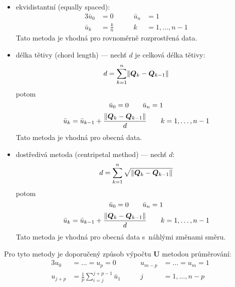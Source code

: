 \begin{itemize}
    \item ekvidistantní (equally spaced):
          \begin{alignat}{3}
              \bar{u}_0 & = 0           \quad\quad & \bar{u}_n & =1                 \\
              \bar{u}_k & = \frac{k}{n} \quad\quad & k         & = 1, \ldots, n - 1
          \end{alignat}
          Tato metoda je vhodná pro rovnoměrně rozprostřená data.
    \item délka tětivy (chord length) --- nechť $d$ je celková délka tětivy:
          \begin{equation}
              d = \sum_{k = 1}^{n}\lVert\bm{Q}_k - \bm{Q}_{k - 1}\rVert
          \end{equation}
          potom
          \begin{equation}
              \bar{u}_0 = 0 \quad\quad \bar{u}_n = 1\\
          \end{equation}
          \begin{equation}
              \bar{u}_k = \bar{u}_{k - 1} + \frac{\lVert\bm{Q}_k - \bm{Q}_{k - 1}\rVert}{d}
              \quad\quad k=1,\ldots,n-1
              \label{eq:chord length}
          \end{equation}
          Tato metoda je vhodná pro obecná data.
    \item dostředivá metoda (centripetal method) --- nechť $d$:
          \begin{equation}
              d = \sum_{k = 1}^{n}\sqrt{\lVert\bm{Q}_k - \bm{Q}_{k - 1}\rVert}
          \end{equation}
          potom
          \begin{equation}
              \bar{u}_0 = 0 \quad\quad \bar{u}_n = 1\\
          \end{equation}
          \begin{equation}
              \bar{u}_k = \bar{u}_{k - 1} + \frac{\lVert\bm{Q}_k - \bm{Q}_{k - 1}\rVert}{d}
              \quad\quad k=1,\ldots,n-1
              \label{eq:centripetal method}
          \end{equation}
          Tato metoda je vhodná pro obecná data s~náhlými změnami směru.
\end{itemize}
Pro tyto metody je doporučený způsob výpočtu $\bm{U}$ metodou průměrování:
\begin{alignat}{3}
    u_0     & = \ldots = u_p = 0 \quad\quad                      & u_{m-p} & = \ldots = u_m = 1 \nonumber                             \\
    u_{j+p} & =\frac{1}{p}\sum_{i=j}^{j+p-1}\bar{u}_1 \quad\quad & j       & =1,\ldots, n -p    \label{eq:uzlový vektor průměrováním}
\end{alignat}
